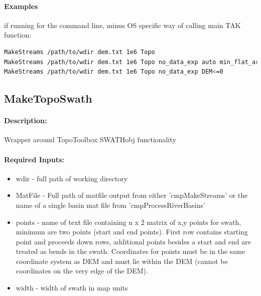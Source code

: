 \paragraph{Examples} if running for the command line, minus OS specific way of calling main TAK function:
\begin{lstlisting}[language=bash]
MakeStreams /path/to/wdir dem.txt 1e6 Topo
MakeStreams /path/to/wdir dem.txt 1e6 Topo no_data_exp auto min_flat_area 1e6
MakeStreams /path/to/wdir dem.txt 1e6 Topo no_data_exp DEM<=0
\end{lstlisting}

\subsection{MakeTopoSwath}
\paragraph{Description:}
Wrapper around TopoToolbox SWATHobj functionality

\paragraph{Required Inputs:}
\begin{itemize}
\item wdir - full path of working directory
\item MatFile - Full path of matfile output from either 'cmpMakeStreams' or the name of a single basin mat file from 'cmpProcessRiverBasins'
\item points - name of text file containing n x 2 matrix of x,y points for swath, minimum are two points (start and end points).
First row contains starting point and proceeds down rows, additional points besides a start and end are
treated as bends in the swath. Coordinates for points must be in the same coordinate system as DEM and must
lie within the DEM (cannot be coordinates on the very edge of the DEM).
\item width - width of swath in map units
\end{itemize}

